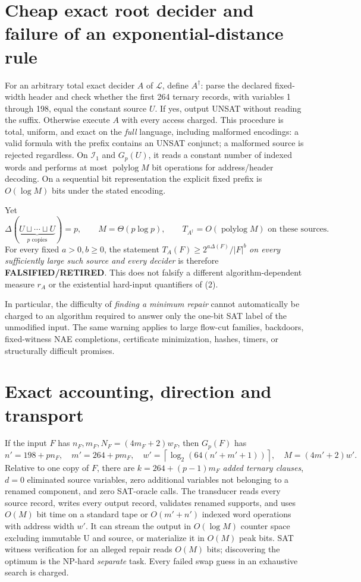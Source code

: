 \documentclass[11pt]{article}
\begin{document}
\section{Cheap exact root decider and failure of an exponential-distance rule}
For an arbitrary total exact decider \(A\) of \(\mathcal L\), define \(A^\dagger\): parse the declared fixed-width header and check whether the first 264 ternary records, with variables 1 through 198, equal the constant source \(U\). If yes, output UNSAT without reading the suffix. Otherwise execute \(A\) with every access charged. This procedure is total, uniform, and exact on the \emph{full} language, including malformed encodings: a valid formula with the prefix contains an UNSAT conjunct; a malformed source is rejected regardless. On \(\mathcal I_1\) and \(G_p(U)\), it reads a constant number of indexed words and performs at most \(\operatorname{polylog}M\) bit operations for address/header decoding. On a sequential bit representation the explicit fixed prefix is \(O(\log M)\) bits under the stated encoding.

Yet
\[
\Delta(\underbrace{U\sqcup\cdots\sqcup U}_{p\text{ copies}})=p,\qquad
M=\Theta(p\log p),\qquad
T_{A^\dagger}=O(\operatorname{polylog}M)\text{ on these sources}.
\tag{8}
\]
For every fixed \(a>0,b\ge0\), the statement
\(T_A(F)\ge2^{a\Delta(F)}/|F|^b\) \emph{on every sufficiently large such source and every decider} is therefore \textbf{FALSIFIED/RETIRED}. This does not falsify a different algorithm-dependent measure \(r_A\) or the existential hard-input quantifiers of (2).

In particular, the difficulty of \emph{finding a minimum repair} cannot automatically be charged to an algorithm required to answer only the one-bit SAT label of the unmodified input. The same warning applies to large flow-cut families, backdoors, fixed-witness NAE completions, certificate minimization, hashes, timers, or structurally difficult promises.

\section{Exact accounting, direction and transport}
If the input \(F\) has \(n_F,m_F,N_F=(4m_F+2)w_F\), then \(G_p(F)\) has
\[
n'=198+pn_F,\quad m'=264+pm_F,\quad
w'=\left\lceil\log_2(64(n'+m'+1))\right\rceil,\quad
M=(4m'+2)w'.
\tag{9}
\]
Relative to one copy of \(F\), there are \(k=264+(p-1)m_F\) \emph{added ternary clauses}, \(d=0\) eliminated source variables, zero additional variables not belonging to a renamed component, and zero SAT-oracle calls. The transducer reads every source record, writes every output record, validates renamed supports, and uses \(O(M)\) bit time on a standard tape or \(O(m'+n')\) indexed word operations with address width \(w'\). It can stream the output in \(O(\log M)\) counter space excluding immutable U and source, or materialize it in \(O(M)\) peak bits. SAT witness verification for an alleged repair reads \(O(M)\) bits; discovering the optimum is the NP-hard \emph{separate} task. Every failed swap guess in an exhaustive search is charged.
\end{document}
